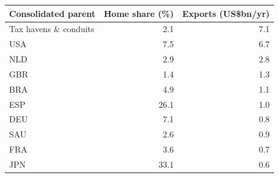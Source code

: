 \begin{tabular}{lrr}
\toprule
Consolidated parent & Home share (\%) & Exports (US\$bn/yr) \\
\midrule
Tax havens \& conduits & 2.1 & 7.1 \\
USA & 7.5 & 6.7 \\
NLD & 2.9 & 2.8 \\
GBR & 1.4 & 1.3 \\
BRA & 4.9 & 1.1 \\
ESP & 26.1 & 1.0 \\
DEU & 7.1 & 0.8 \\
SAU & 2.6 & 0.9 \\
FRA & 3.6 & 0.7 \\
JPN & 33.1 & 0.6 \\
\bottomrule
\end{tabular}
